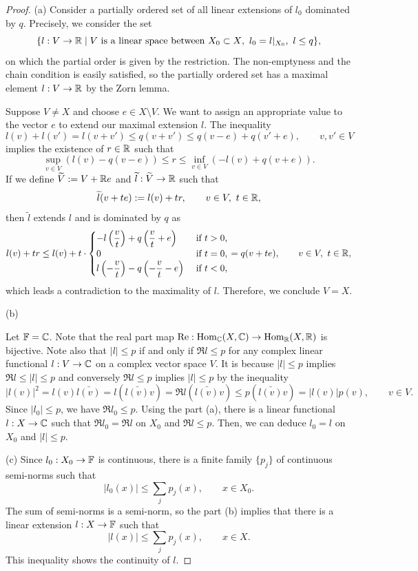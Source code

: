 \documentclass{../../large}
\begin{document}
\begin{proof}
(a)
Consider a partially ordered set of all linear extensions of $l_0$ dominated by $q$.
Precisely, we consider the set
\[\{l:V\to\mathbb{R}\mid\text{$V$ is a linear space between $X_0\subset X$},\ l_0=l|_{X_0},\ l\le q\},\]
on which the partial order is given by the restriction.
The non-emptyness and the chain condition is easily satisfied, so the partially ordered set has a maximal element $l:V\to\mathbb{R}$ by the Zorn lemma.

Suppose $V\ne X$ and choose $e\in X\setminus V$.
We want to assign an appropriate value to the vector $e$ to extend our maximal extension $l$.
The inequality
\[l(v)+l(v')=l(v+v')\le q(v+v')\le q(v-e)+q(v'+e),\qquad v,v'\in V\]
implies the existence of $r\in\mathbb{R}$ such that
\[\sup_{v\in V}(l(v)-q(v-e))\le r\le\inf_{v\in V}(-l(v)+q(v+e)).\]
If we define $\widetilde V:=V+\mathbb{R} e$ and $\widetilde l:\widetilde V\to\mathbb{R}$ such that
\[\tilde l(v+te):=l(v)+tr,\qquad v\in V,\ t\in\R,\]
then $\tilde l$ extends $l$ and is dominated by $q$ as
\[l(v)+tr\le l(v)+t\cdot
\begin{cases}
-l\left(\dfrac vt\right)+q\left(\dfrac vt+e\right)&\text{ if }t>0,\\
0&\text{ if }t=0,\\
l\left(-\dfrac vt\right)-q\left(-\dfrac vt-e\right)&\text{ if }t<0,
\end{cases}
=q(v+te),\qquad v\in V,\ t\in\mathbb{R},
\]
which leads a contradiction to the maximality of $l$.
Therefore, we conclude $V=X$.

(b)

Let $\mathbb{F}=\mathbb{C}$.
Note that the real part map $\operatorname{Re}:\operatorname{Hom}_{\mathbb{C}}(X,\mathbb{C})\to\operatorname{Hom}_{\mathbb{R}}(X,\mathbb{R})$ is bijective.
Note also that $|l|\le p$ if and only if $\Re l\le p$ for any complex linear functional $l:V\to\mathbb{C}$ on a complex vector space $V$.
It is because $|l|\le p$ implies $\Re l\le|l|\le p$ and conversely $\Re l\le p$ implies $|l|\le p$ by the inequality
\[|l(v)|^2=l(v)\bar{l(v)}=l(\bar{l(v)}v)=\Re l(\bar{l(v)}v)\le p(\bar{l(v)}v)=|l(v)|p(v),\qquad v\in V.\]
Since $|l_0|\le p$, we have $\Re l_0\le p$.
Using the part (a), there is a linear functional $l:X\to\mathbb{C}$ such that $\Re l_0=\Re l$ on $X_0$ and $\Re l\le p$.
Then, we can deduce $l_0=l$ on $X_0$ and $|l|\le p$.

(c)
Since $l_0:X_0\to\mathbb{F}$ is continuous, there is a finite family $\{p_j\}$ of continuous semi-norms such that
\[|l_0(x)|\le\sum_jp_j(x),\qquad x\in X_0.\]
The sum of semi-norms is a semi-norm, so the part (b) implies that there is a linear extension $l:X\to\mathbb{F}$ such that
\[|l(x)|\le\sum_jp_j(x),\qquad x\in X.\]
This inequality shows the continuity of $l$.

\end{proof}
\end{document}
